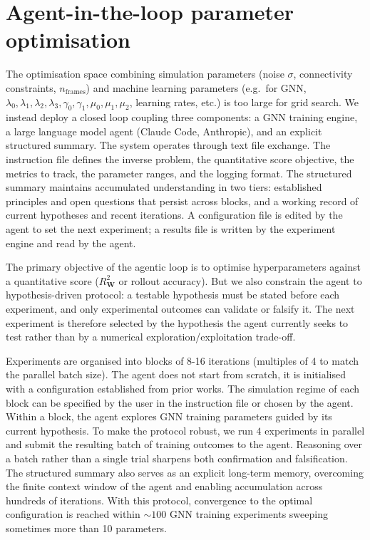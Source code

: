 \documentclass{article}
\begin{document}


\section{Agent-in-the-loop parameter optimisation}
\label{app:agent}

The optimisation space combining simulation parameters (noise $\sigma$,
connectivity constraints, $n_{\mathrm{frames}}$) and machine learning parameters
(e.g.\ for GNN, $\lambda_0,\lambda_1,\lambda_2,\lambda_3,\gamma_0,\gamma_1,\mu_0,\mu_1,\mu_2$, learning rates, etc.) is too large for grid search. We instead deploy a closed loop
coupling three components: a GNN training engine, a large language model
agent (Claude Code, Anthropic), and an explicit structured summary. The system
operates through text file exchange. The instruction file defines the inverse
problem, the quantitative score objective, the metrics to track, the parameter
ranges, and the logging format. The structured summary maintains accumulated
understanding in two tiers: established principles and open questions that
persist across blocks, and a working record of current hypotheses and recent
iterations. A configuration file is edited by the agent to set the next
experiment; a results file is written by the experiment engine and read by
the agent.

The primary objective of the agentic loop is to optimise hyperparameters
against a quantitative score ($R^2_{\mathbf{W}}$ or rollout accuracy). But we
also constrain the agent to hypothesis-driven protocol: a testable
hypothesis must be stated before each experiment, and only experimental
outcomes can validate or falsify it. The next experiment is therefore
selected by the hypothesis the agent currently seeks to test rather than by a
numerical exploration/exploitation trade-off.

Experiments are organised into blocks of 8-16 iterations (multiples of 4 to
match the parallel batch size). The agent does not start from scratch, it is initialised with a configuration established from prior works. The simulation
regime of each block can be specified by the user in the instruction file or
chosen by the agent. Within a block, the agent explores GNN training
parameters guided by its current hypothesis. To make the protocol robust, we
run $4$ experiments in parallel and submit the resulting batch of training
outcomes to the agent. Reasoning over a batch rather than a single trial
sharpens both confirmation and falsification. The structured summary also
serves as an explicit long-term memory, overcoming the finite context window
of the agent and enabling accumulation across hundreds of iterations. With
this protocol, convergence to the optimal configuration is reached within
$\sim 100$ GNN training experiments sweeping sometimes more than 10 parameters.
\end{document}
